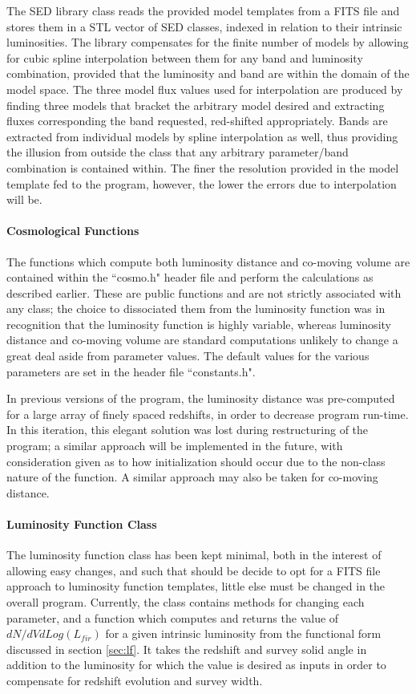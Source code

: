 \documentclass[twocolumn,letterpaper,10pt]{article}
\begin{document}
The SED library class reads the provided model templates from a FITS file and stores them in a STL vector of SED classes, indexed in relation to their intrinsic luminosities. The library compensates for the finite number of models by allowing for cubic spline interpolation between them for any band and luminosity combination, provided that the luminosity and band are within the domain of the model space. The three model flux values used for interpolation are produced by finding three models that bracket the arbitrary model desired and extracting fluxes corresponding the band requested, red-shifted appropriately. Bands are extracted from individual models by spline interpolation as well, thus providing the illusion from outside the class that any arbitrary parameter/band combination is contained within. The finer the resolution provided in the model template fed to the program, however, the lower the errors due to interpolation will be. 

\paragraph{Cosmological Functions}
The functions which compute both luminosity distance and co-moving volume are contained within the ``cosmo.h" header file and perform the calculations as described earlier. These are public functions and are not strictly associated with any class; the choice to dissociated them from the luminosity function was in recognition that the luminosity function is highly variable, whereas luminosity distance and co-moving volume are standard computations unlikely to change a great deal aside from parameter values. The default values for the various parameters are set in the header file ``constants.h".

In previous versions of the program, the luminosity distance was pre-computed for a large array of finely spaced redshifts, in order to decrease program run-time. In this iteration, this elegant solution was lost during restructuring of the program; a similar approach will be implemented in the future, with consideration given as to how initialization should occur due to the non-class nature of the function. A similar approach may also be taken for co-moving distance.

\paragraph{Luminosity Function Class}
The luminosity function class has been kept minimal, both in the interest of allowing easy changes, and such that should be decide to opt for a FITS file approach to luminosity function templates, little else must be changed in the overall program. Currently, the class contains methods for changing each parameter, and a function which computes and returns the value of $dN/dVdLog(L_{fir})$ for a given intrinsic luminosity from the functional form discussed in section \ref{sec:lf}. It takes the redshift and survey solid angle in addition to the luminosity for which the value is desired as inputs in order to compensate for redshift evolution and survey width.
\end{document}
